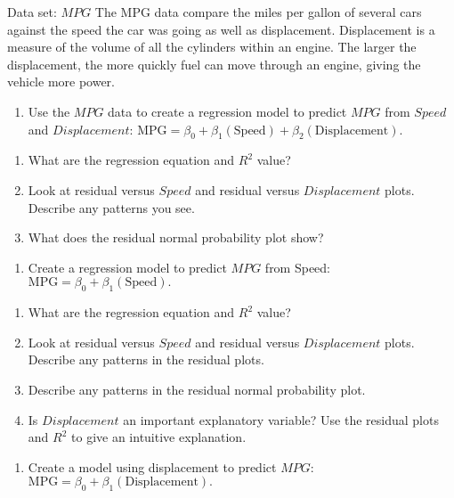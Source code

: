 \documentclass[
]{report}
\providecommand{\tightlist}{%
  \setlength{\itemsep}{0pt}\setlength{\parskip}{0pt}}
\theoremstyle{definition}
\theoremstyle{definition}
\theoremstyle{definition}
\theoremstyle{definition}
\theoremstyle{remark}
\begin{document}
Data set: \(MPG\)
The MPG data compare the miles per gallon of several cars against the speed the car was going as well as displacement. Displacement is a measure of the volume of all the cylinders within an engine. The larger the displacement, the more quickly fuel can move through an engine, giving the vehicle more power.

\begin{enumerate}
\def\labelenumi{\arabic{enumi}.}
\setcounter{enumi}{36}
\tightlist
\item
  Use the \(MPG\) data to create a regression model to predict \(MPG\) from \(Speed\) and \(Displacement\): \(\mathrm{MPG} = \beta_0 + \beta_1(\mathrm{Speed}) + \beta_2(\mathrm{Displacement}).\)
\end{enumerate}

\begin{enumerate}
\def\labelenumi{\alph{enumi}.}
\tightlist
\item
  What are the regression equation and \(R^2\) value?
\item
  Look at residual versus \(Speed\) and residual versus \(Displacement\) plots. Describe any patterns you see.
\item
  What does the residual normal probability plot show?
\end{enumerate}

\begin{enumerate}
\def\labelenumi{\arabic{enumi}.}
\setcounter{enumi}{37}
\tightlist
\item
  Create a regression model to predict \(MPG\) from Speed: \(\mathrm{MPG} = \beta_0 + \beta_1(\mathrm{Speed}).\)
\end{enumerate}

\begin{enumerate}
\def\labelenumi{\alph{enumi}.}
\tightlist
\item
  What are the regression equation and \(R^2\) value?
\item
  Look at residual versus \(Speed\) and residual versus \(Displacement\) plots. Describe any patterns in the residual plots.
\item
  Describe any patterns in the residual normal probability plot.
\item
  Is \(Displacement\) an important explanatory variable? Use the residual plots and \(R^2\) to give an intuitive explanation.
\end{enumerate}

\begin{enumerate}
\def\labelenumi{\arabic{enumi}.}
\setcounter{enumi}{38}
\tightlist
\item
  Create a model using displacement to predict \(MPG\): \(\mathrm{MPG} = \beta_0 + \beta_1(\mathrm{Displacement}).\)
\end{enumerate}
\end{document}
